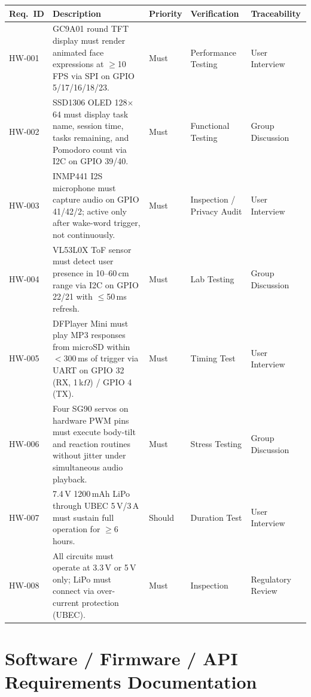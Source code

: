 \documentclass[12pt,a4paper]{article}
\begin{document}
\begin{center}
\scriptsize
\begin{tabular}{|L{0.07\textwidth}|L{0.35\textwidth}|L{0.10\textwidth}|L{0.18\textwidth}|L{0.18\textwidth}|}
\hline
\textbf{Req.~ID} & \textbf{Description} & \textbf{Priority} &
\textbf{Verification} & \textbf{Traceability} \\ \hline
HW-001 &
GC9A01 round TFT display must render animated face expressions at
$\geq$10\,FPS via SPI on GPIO 5/17/16/18/23. &
Must &
Performance Testing &
User Interview \\ \hline
HW-002 &
SSD1306 OLED 128$\times$64 must display task name, session time,
tasks remaining, and Pomodoro count via I2C on GPIO 39/40. &
Must &
Functional Testing &
Group Discussion \\ \hline
HW-003 &
INMP441 I2S microphone must capture audio on GPIO 41/42/2;
active only after wake-word trigger, not continuously. &
Must &
Inspection / Privacy Audit &
User Interview \\ \hline
HW-004 &
VL53L0X ToF sensor must detect user presence in 10--60\,cm
range via I2C on GPIO 22/21 with $\leq$50\,ms refresh. &
Must &
Lab Testing &
Group Discussion \\ \hline
HW-005 &
DFPlayer Mini must play MP3 responses from microSD within
$<$300\,ms of trigger via UART on GPIO 32 (RX, 1\,k$\Omega$)
/ GPIO 4 (TX). &
Must &
Timing Test &
User Interview \\ \hline
HW-006 &
Four SG90 servos on hardware PWM pins must execute body-tilt
and reaction routines without jitter under simultaneous audio
playback. &
Must &
Stress Testing &
Group Discussion \\ \hline
HW-007 &
7.4\,V 1200\,mAh LiPo through UBEC 5\,V/3\,A must sustain
full operation for $\geq$6 hours. &
Should &
Duration Test &
User Interview \\ \hline
HW-008 &
All circuits must operate at 3.3\,V or 5\,V only; LiPo must
connect via over-current protection (UBEC). &
Must &
Inspection &
Regulatory Review \\ \hline
\end{tabular}
\end{center}

\newpage
\section*{Software / Firmware / API Requirements Documentation}
\end{document}
